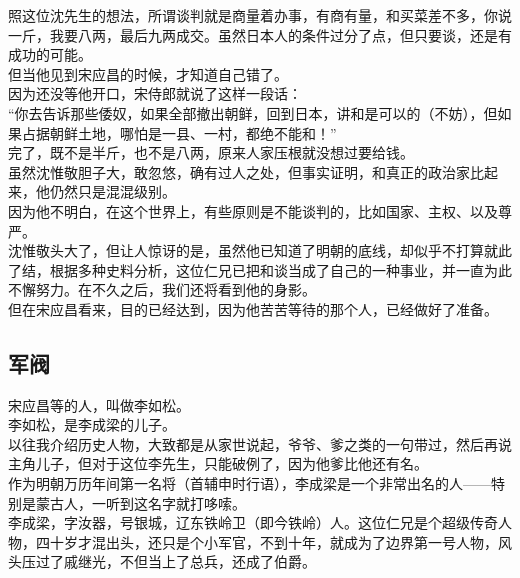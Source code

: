 \begin{multicols}{\theparacolNo}
照这位沈先生的想法，所谓谈判就是商量着办事，有商有量，和买菜差不多，你说一斤，我要八两，最后九两成交。虽然日本人的条件过分了点，但只要谈，还是有成功的可能。\\

但当他见到宋应昌的时候，才知道自己错了。\\

因为还没等他开口，宋侍郎就说了这样一段话：\\

“你去告诉那些倭奴，如果全部撤出朝鲜，回到日本，讲和是可以的（不妨），但如果占据朝鲜土地，哪怕是一县、一村，都绝不能和！”\\

完了，既不是半斤，也不是八两，原来人家压根就没想过要给钱。\\

虽然沈惟敬胆子大，敢忽悠，确有过人之处，但事实证明，和真正的政治家比起来，他仍然只是混混级别。\\

因为他不明白，在这个世界上，有些原则是不能谈判的，比如国家、主权、以及尊严。\\

沈惟敬头大了，但让人惊讶的是，虽然他已知道了明朝的底线，却似乎不打算就此了结，根据多种史料分析，这位仁兄已把和谈当成了自己的一种事业，并一直为此不懈努力。在不久之后，我们还将看到他的身影。\\

但在宋应昌看来，目的已经达到，因为他苦苦等待的那个人，已经做好了准备。\\

\subsection{军阀}
宋应昌等的人，叫做李如松。\\

李如松，是李成梁的儿子。\\

以往我介绍历史人物，大致都是从家世说起，爷爷、爹之类的一句带过，然后再说主角儿子，但对于这位李先生，只能破例了，因为他爹比他还有名。\\

作为明朝万历年间第一名将（首辅申时行语），李成梁是一个非常出名的人——特别是蒙古人，一听到这名字就打哆嗦。\\

李成梁，字汝器，号银城，辽东铁岭卫（即今铁岭）人。这位仁兄是个超级传奇人物，四十岁才混出头，还只是个小军官，不到十年，就成为了边界第一号人物，风头压过了戚继光，不但当上了总兵，还成了伯爵。\\


\end{multicols}
